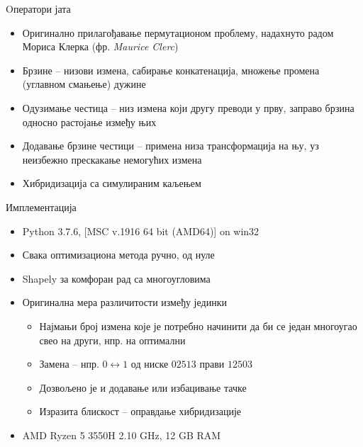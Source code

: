 \documentclass{beamer}
\begin{document}
\begin{frame}{Oператори јата}
\begin{itemize}
\item Оригинално прилагођавање пермутационом проблему, надахнуто радом Мориса Клерка (фр. \textit{Maurice Clerc})

\item Брзине -- низови измена, сабирање конкатенација, множење промена (углавном смањење) дужине

\item Одузимање честица -- низ измена који другу преводи у прву, заправо брзина односно растојање између њих

\item Додавање брзине честици -- примена низа трансформација на њу, уз неизбежно прескакање немогућих измена

\item Хибридизација са симулираним каљењем
\end{itemize}
\end{frame}

\begin{frame}{Имплементација}
\begin{itemize}
\item Python 3.7.6, [MSC v.1916 64 bit (AMD64)] on win32

\item Свака оптимизациона метода ручно, од нуле

\item Shapely за комфоран рад са многоугловима

\item Оригинална мера различитости између јединки
\begin{itemize}
\item Најмањи број измена које је потребно начинити да би се један многоугао свео на други, нпр. на оптимални

\item Замена -- нпр. $0 \leftrightarrow 1$ од ниске $02513$ прави $12503$

\item Дозвољено је и додавање или избацивање тачке

\item Изразита блискост -- оправдање хибридизације
\end{itemize}

\item AMD Ryzen 5 3550H 2.10 GHz, 12 GB RAM
\end{itemize}
\end{frame}
\end{document}
